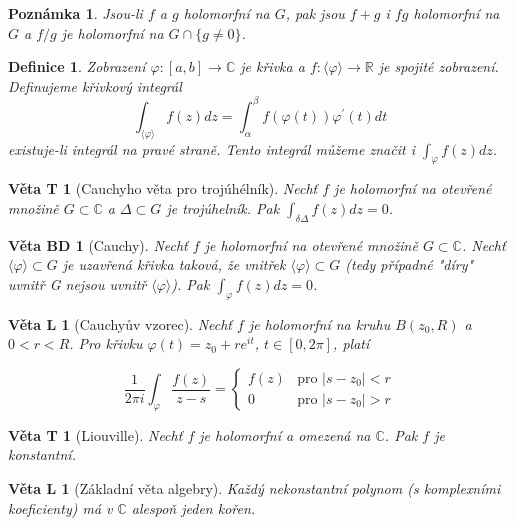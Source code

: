 \documentclass[11pt,a4paper]{article}
\newcounter{vety}
\newtheorem*{definice}{Definice}
\newtheorem{vetal}[vety]{Věta L}
\newtheorem{vetat}[vety]{Věta T}
\newtheorem{vetabd}[vety]{Věta BD}
\newtheorem*{poznamka}{Poznámka}
\begin{document}
\begin{poznamka}
Jsou-li $f$ a $g$ holomorfní na $G$, pak jsou $f+g$ i $f g$ holomorfní na $G$ a $f/g$ je holomorfní na $G \cap \{g \neq 0\}$.
\end{poznamka}

\begin{definice}
Zobrazení $\varphi : [a,b] \rightarrow \mathbb{C}$ je křivka a $f : \langle \varphi \rangle \rightarrow \mathbb{R}$ je spojité zobrazení. Definujeme křivkový integrál
$$\int_{\langle \varphi \rangle} f(z) dz = \int_\alpha^\beta f( \varphi (t)) \varphi^\prime(t) dt$$
existuje-li integrál na pravé straně. Tento integrál můžeme značit i $\int_\varphi f(z) dz$.
\end{definice}

\begin{vetat}[Cauchyho věta pro trojúhélník]
Nechť $f$ je holomorfní na otevřené množině $G \subset \mathbb{C}$ a $\Delta \subset G$ je trojúhelník. Pak $\int_{\delta \Delta} f(z) dz = 0$.
\end{vetat}

\begin{vetabd}[Cauchy]
Nechť $f$ je holomorfní na otevřené množině $G \subset \mathbb{C}$. Nechť $\langle \varphi \rangle \subset G$ je uzavřená křivka taková, že vnitřek $\langle \varphi \rangle \subset G$ (tedy případné "díry" uvnitř G nejsou uvnitř $\langle \varphi \rangle$). Pak $\int_\varphi f(z)dz=0$.
\end{vetabd}

\begin{vetal}[Cauchyův vzorec]
Nechť $f$ je holomorfní na kruhu $B(z_0, R)$ a $0<r<R$. Pro křivku $\varphi(t) = z_0 + r e^{it}$, $t \in [0,2\pi]$, platí

\begin{equation}
\frac{1}{2 \pi i} \int_\varphi \frac{f(z)}{z-s}  = \left\{ \begin{array}{ll}
 f(z) & \textrm{pro $|s-z_0| < r$} \nonumber\\
 0 & \textrm{pro $| s-z_0 | > r$}
  \end{array} \right.
\end{equation}
\end{vetal}

\begin{vetat}[Liouville]
Nechť $f$ je holomorfní a omezená na $\mathbb{C}$. Pak $f$ je konstantní.
\end{vetat}

\begin{vetal}[Základní věta algebry]
Každý nekonstantní polynom (s komplexními koeficienty) má v $\mathbb{C}$ alespoň jeden kořen.
\end{vetal}
\end{document}
